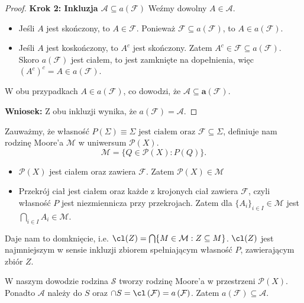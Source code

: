 \begin{proof}
\noindent \textbf{Krok 2: Inkluzja $\mathcal{A} \subseteq a(\mathcal{F})$} Weźmy dowolny $A \in \mathcal{A}$. 
\begin{itemize} 
	\item Jeśli $A$ jest skończony, to $A \in \mathcal{F}$. Ponieważ $\mathcal{F} \subseteq a(\mathcal{F})$, to $A \in a(\mathcal{F})$. 
	\item Jeśli $A$ jest koskończony, to $A^c$ jest skończony. Zatem $A^c \in \mathcal{F} \subseteq a(\mathcal{F})$. Skoro $a(\mathcal{F})$ jest ciałem, to jest zamknięte na dopełnienia, więc $(A^c)^c = A \in a(\mathcal{F})$. 
\end{itemize} 

W obu przypadkach $A \in a(\mathcal{F})$, co dowodzi, że $\bm{\mathcal{A} \subseteq a(\mathcal{F})}$. 

\noindent \textbf{Wniosek:} Z obu inkluzji wynika, że $a(\mathcal{F}) = \mathcal{A}$. 
\end{proof}
\begin{remark}
	Zauważmy, że własność $P\left( \Sigma  \right)  \equiv \Sigma \text{ jest ciałem oraz }\mathcal{F}\subseteq \Sigma $, definiuje nam rodzinę Moore'a $\mathcal{M}$ w uniwersum $\mathcal{P}(X) $.
	 \[
	\mathcal{M} = \{Q \in \mathcal{P}(X): P(Q) \} 
	.\] 
	\begin{itemize}
		\item $\mathcal{P}(X) $ jest ciałem oraz zawiera $\mathcal{F}$. Zatem $\mathcal{P}(X) \in \mathcal{M} $
		\item Przekrój ciał jest ciałem oraz każde z krojonych ciał zawiera $\mathcal{F}$, czyli własność $P$ jest niezmiennicza przy przekrojach. Zatem dla $\{A_{i}\}_{i \in I} \in \mathcal{M}$ jest $\bigcap_{i \in  I}A_{i} \in \mathcal{M} $. 
	\end{itemize}
Daje nam to domknięcie, i.e. $\cl(Z) = \bigcap\{M\in \mathcal{M}: Z\subseteq M\} $. $\cl(Z)$ jest najmniejszym w sensie inkluzji zbiorem spełniającym własność $P$, zawierającym zbiór $Z$.

W naszym dowodzie rodzina  $\mathcal{S}$ tworzy rodzinę Moore'a w przestrzeni $\mathcal{P}(X) $. Ponadto $\mathcal{A}$ należy do $S$ oraz  $\cap S = \cl\left( \mathcal{F} \right) = a\left( \mathcal{F} \right) $. Zatem $a\left( \mathcal{F} \right) \subseteq \mathcal{A}$.
\end{remark} 

